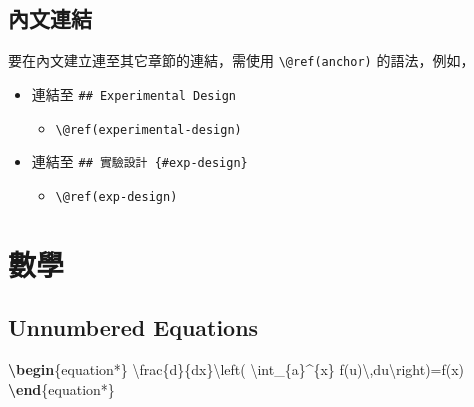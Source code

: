 \documentclass[oneside]{book}
\newenvironment{Shaded}{\begin{snugshade}}{\end{snugshade}}
\newcommand{\ExtensionTok}[1]{#1}
\newcommand{\KeywordTok}[1]{\textcolor[rgb]{0.13,0.29,0.53}{\textbf{#1}}}
\newcommand{\NormalTok}[1]{#1}
\newcommand{\SpecialCharTok}[1]{\textcolor[rgb]{0.00,0.00,0.00}{#1}}
\newcommand{\SpecialStringTok}[1]{\textcolor[rgb]{0.31,0.60,0.02}{#1}}
\providecommand{\tightlist}{%
  \setlength{\itemsep}{0pt}\setlength{\parskip}{0pt}}
\theoremstyle{definition}
\theoremstyle{definition}
\theoremstyle{definition}
\theoremstyle{remark}
\begin{document}
\hypertarget{ux5167ux6587ux9023ux7d50}{%
\subsection{內文連結}\label{ux5167ux6587ux9023ux7d50}}

要在內文建立連至其它章節的連結，需使用 \texttt{\textbackslash{}@ref(anchor)} 的語法，例如，

\begin{itemize}
\tightlist
\item
  連結至 \texttt{\#\#\ Experimental\ Design}

  \begin{itemize}
  \tightlist
  \item
    \texttt{\textbackslash{}@ref(experimental-design)}
  \end{itemize}
\item
  連結至 \texttt{\#\#\ 實驗設計\ \{\#exp-design\}}

  \begin{itemize}
  \tightlist
  \item
    \texttt{\textbackslash{}@ref(exp-design)}
  \end{itemize}
\end{itemize}

\hypertarget{math}{%
\section{數學}\label{math}}

\hypertarget{unnumbered-equations}{%
\subsection{Unnumbered Equations}\label{unnumbered-equations}}

\begin{Shaded}
\begin{Highlighting}[]
\KeywordTok{\textbackslash{}begin}\NormalTok{\{}\ExtensionTok{equation*}\NormalTok{\}}\SpecialStringTok{ }
\SpecialCharTok{\textbackslash{}frac}\SpecialStringTok{\{d\}\{dx\}}\SpecialCharTok{\textbackslash{}left}\SpecialStringTok{( }\SpecialCharTok{\textbackslash{}int}\SpecialStringTok{_\{a\}^\{x\} f(u)}\SpecialCharTok{\textbackslash{},}\SpecialStringTok{du}\SpecialCharTok{\textbackslash{}right}\SpecialStringTok{)=f(x)}
\KeywordTok{\textbackslash{}end}\NormalTok{\{}\ExtensionTok{equation*}\NormalTok{\} }
\end{Highlighting}
\end{Shaded}
\end{document}
